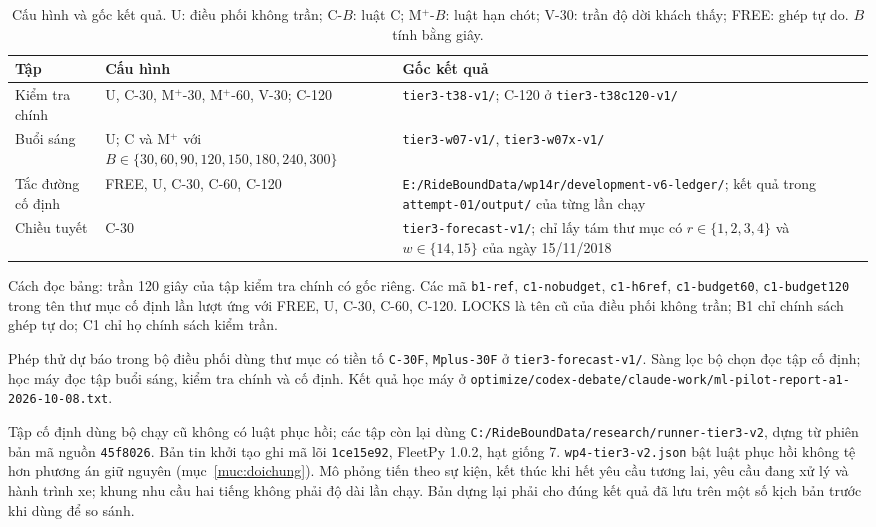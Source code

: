 \begin{table}[htbp]
\centering
\caption{Cấu hình và gốc kết quả. U: điều phối không trần; C-$B$: luật C; M$^+$-$B$: luật hạn chót; V-30: trần độ dời khách thấy; FREE: ghép tự do. $B$ tính bằng giây.}
\label{bang:pl-goc}
\begin{tabular}{@{}p{2.8cm}p{5.2cm}p{6.8cm}@{}}
\toprule
\textbf{Tập} & \textbf{Cấu hình} & \textbf{Gốc kết quả} \\
\midrule
Kiểm tra chính & U, C-30, M$^+$-30, M$^+$-60, V-30; C-120 & \nolinkurl{tier3-t38-v1/}; C-120 ở \nolinkurl{tier3-t38c120-v1/} \\
Buổi sáng & U; C và M$^+$ với $B\in\{30,60,90,120,150,180,240,300\}$ & \nolinkurl{tier3-w07-v1/}, \nolinkurl{tier3-w07x-v1/} \\
Tắc đường cố định & FREE, U, C-30, C-60, C-120 & \nolinkurl{E:/RideBoundData/wp14r/development-v6-ledger/}; kết quả trong \nolinkurl{attempt-01/output/} của từng lần chạy \\
Chiều tuyết & C-30 & \nolinkurl{tier3-forecast-v1/}; chỉ lấy tám thư mục có $r\in\{1,2,3,4\}$ và $w\in\{14,15\}$ của ngày 15/11/2018 \\
\bottomrule
\end{tabular}
\end{table}

Cách đọc bảng: trần 120 giây của tập kiểm tra chính có gốc riêng. Các mã \nolinkurl{b1-ref}, \nolinkurl{c1-nobudget}, \nolinkurl{c1-h6ref}, \nolinkurl{c1-budget60}, \nolinkurl{c1-budget120} trong tên thư mục cố định lần lượt ứng với FREE, U, C-30, C-60, C-120. LOCKS là tên cũ của điều phối không trần; B1 chỉ chính sách ghép tự do; C1 chỉ họ chính sách kiểm trần.

Phép thử dự báo trong bộ điều phối dùng thư mục có tiền tố \texttt{C-30F}, \texttt{Mplus-30F} ở \nolinkurl{tier3-forecast-v1/}. Sàng lọc bộ chọn đọc tập cố định; học máy đọc tập buổi sáng, kiểm tra chính và cố định. Kết quả học máy ở \nolinkurl{optimize/codex-debate/claude-work/ml-pilot-report-a1-2026-10-08.txt}.

Tập cố định dùng bộ chạy cũ không có luật phục hồi; các tập còn lại dùng \nolinkurl{C:/RideBoundData/research/runner-tier3-v2}, dựng từ phiên bản mã nguồn \texttt{45f8026}. Bản tin khởi tạo ghi mã lõi \texttt{1ce15e92}, FleetPy 1.0.2, hạt giống 7. \nolinkurl{wp4-tier3-v2.json} bật luật phục hồi không tệ hơn phương án giữ nguyên (mục~\ref{muc:doichung}). Mô phỏng tiến theo sự kiện, kết thúc khi hết yêu cầu tương lai, yêu cầu đang xử lý và hành trình xe; khung nhu cầu hai tiếng không phải độ dài lần chạy. Bản dựng lại phải cho đúng kết quả đã lưu trên một số kịch bản trước khi dùng để so sánh.

